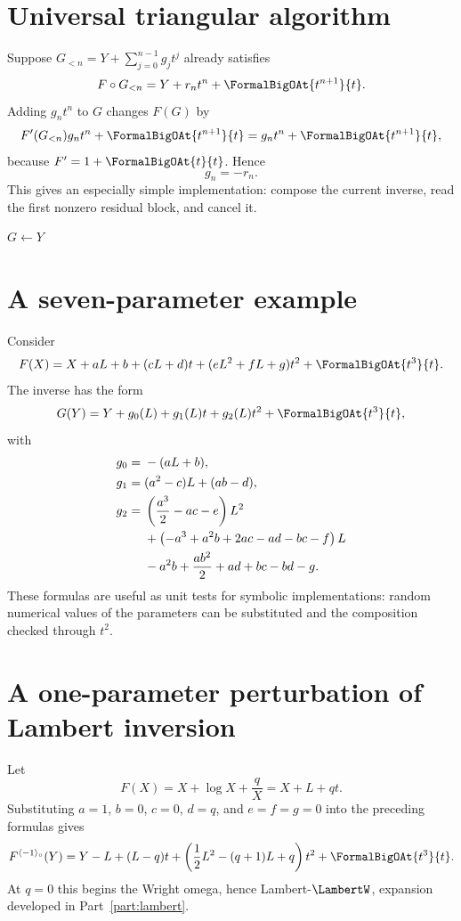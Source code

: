\documentclass[11pt,oneside]{book}
\theoremstyle{definition}
\theoremstyle{remark}
\newcommand{\compinv}{^{\langle-1\rangle_{\circ}}}
\newcommand{\compose}{\mathbin{\circ}}
\newcommand{\trunc}[2]{\left[#1\right]_{\le #2}}
\begin{document}
\section{Universal triangular algorithm}
Suppose $G_{<n}=Y+\sum_{j=0}^{n-1}g_jt^j$ already satisfies
\[
 F\compose G_{<n}=Y+r_nt^n+\FormalBigOAt{t^{n+1}}{t}.
\]
Adding $g_nt^n$ to $G$ changes $F(G)$ by
\[
 F'(G_{<n})g_nt^n+\FormalBigOAt{t^{n+1}}{t}
 =g_nt^n+\FormalBigOAt{t^{n+1}}{t},
\]
because $F'=1+\FormalBigOAt{t}{t}$.  Hence
\begin{equation}\label{eq:triangular-next-block}
 g_n=-r_n.
\end{equation}
This gives an especially simple implementation: compose the current inverse,
read the first nonzero residual block, and cancel it.

\begin{algorithm}[H]
\caption{Residual-cancellation series reversal}
\label{alg:triangular-reversal}
\KwOut{$G=\trunc{F\compinv}{N}$}
$G\leftarrow Y$\;
\For{$n\leftarrow0$ \KwTo $N$}{
  $R\leftarrow\trunc{F\compose G-Y}{n}$\;
  $r_n\leftarrow[t^n]R$\;
  $G\leftarrow G-r_nt^n$\;
}
\;
\end{algorithm}

\section{A seven-parameter example}
Consider
\begin{equation}\label{eq:parametric-F}
 F(X)=X+aL+b+(cL+d)t+(eL^2+fL+g)t^2+\FormalBigOAt{t^3}{t}.
\end{equation}
The inverse has the form
\[
 G(Y)=Y+g_0(L)+g_1(L)t+g_2(L)t^2+\FormalBigOAt{t^3}{t},
\]
with
\begin{align}
 g_0={}&-(aL+b),\label{eq:param-g0}\\
 g_1={}&(a^2-c)L+(ab-d),\label{eq:param-g1}\\
 g_2={}&\left(\frac{a^3}{2}-ac-e\right)L^2\notag\\
 &+\left(-a^3+a^2b+2ac-ad-bc-f\right)L\notag\\
 &-a^2b+\frac{ab^2}{2}+ad+bc-bd-g.
 \label{eq:param-g2}
\end{align}
These formulas are useful as unit tests for symbolic implementations: random
numerical values of the parameters can be substituted and the composition
checked through $t^2$.

\section{A one-parameter perturbation of Lambert inversion}
Let
\begin{equation}\label{eq:F-log-q}
 F(X)=X+\log X+\frac{q}{X}=X+L+qt.
\end{equation}
Substituting $a=1$, $b=0$, $c=0$, $d=q$, and $e=f=g=0$ into the preceding
formulas gives
\begin{equation}\label{eq:inverse-log-q}
 F\compinv(Y)
 =Y-L+(L-q)t
 +\left(\frac12L^2-(q+1)L+q\right)t^2
 +\FormalBigOAt{t^3}{t}.
\end{equation}
At $q=0$ this begins the Wright omega, hence Lambert-$\LambertW$, expansion developed
in Part~\ref{part:lambert}.
\end{document}
